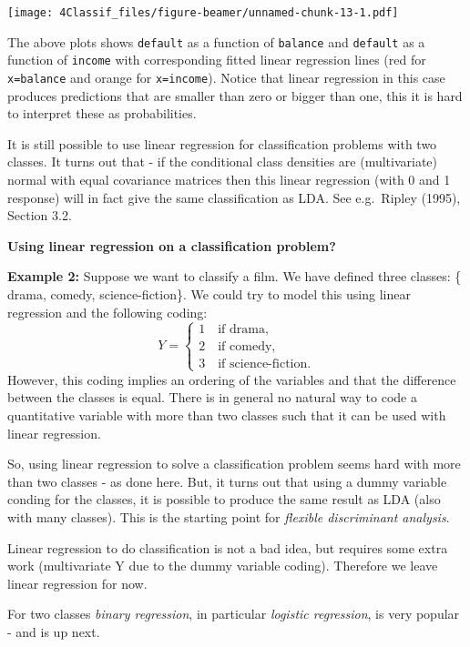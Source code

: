 \documentclass[10pt,ignorenonframetext,]{beamer}
\begin{document}
\begin{frame}

\texttt{[image: 4Classif\_files/figure-beamer/unnamed-chunk-13-1.pdf]}

\end{frame}

\begin{frame}[fragile]

The above plots shows \texttt{default} as a function of \texttt{balance}
and \texttt{default} as a function of \texttt{income} with corresponding
fitted linear regression lines (red for \texttt{x=balance} and orange
for \texttt{x=income}). Notice that linear regression in this case
produces predictions that are smaller than zero or bigger than one, this
it is hard to interpret these as probabilities.

It is still possible to use linear regression for classification
problems with two classes. It turns out that - if the conditional class
densities are (multivariate) normal with equal covariance matrices then
this linear regression (with 0 and 1 response) will in fact give the
same classification as LDA. See e.g.~Ripley (1995), Section 3.2.

\end{frame}

\begin{frame}

\textbf{Using linear regression on a classification problem?}

\textbf{Example 2: } Suppose we want to classify a film. We have defined
three classes: \{ drama, comedy, science-fiction\}. We could try to
model this using linear regression and the following coding:
\[Y = \begin{cases} 1 \quad \text{if drama}, \\ 2 \quad \text{if comedy}, \\ 3 \quad \text{if science-fiction}.\end{cases}\]
However, this coding implies an ordering of the variables and that the
difference between the classes is equal. There is in general no natural
way to code a quantitative variable with more than two classes such that
it can be used with linear regression.

\end{frame}

\begin{frame}

So, using linear regression to solve a classification problem seems hard
with more than two classes - as done here. But, it turns out that using
a dummy variable conding for the classes, it is possible to produce the
same result as LDA (also with many classes). This is the starting point
for \emph{flexible discriminant analysis}.

Linear regression to do classification is not a bad idea, but requires
some extra work (multivariate Y due to the dummy variable coding).
Therefore we leave linear regression for now.

For two classes \emph{binary regression}, in particular \emph{logistic
regression}, is very popular - and is up next.

\end{frame}
\end{document}
